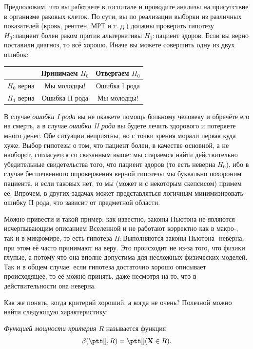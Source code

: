 \begin{example}
Предположим, что вы работаете в госпитале и проводите анализы на присутствие в организме раковых клеток. По сути, вы по реализации выборки из различных показателей (кровь, рентген, МРТ и т. д.) должны проверить гипотезу $H_0\colon\textit{пациент болен раком}$ против альтернативы $H_1\colon\textit{пациент здоров}$. Если вы верно поставили диагноз, то всё хорошо. Иначе вы можете совершить одну из двух ошибок:

\begin{center}
    \begin{tabular}{|c|c|c|}
\hline
 & Принимаем $H_0$ & Отвергаем $H_0$\\
\hline
$H_0$ верна& Мы молодцы! & Ошибка I рода\\
\hline
$H_1$ верна& Ошибка II рода & Мы молодцы!\\
\hline
\end{tabular}
\end{center}

В случае \textit{ошибки I рода} вы не окажете помощь больному человеку и обречёте его на смерть, а в случае \textit{ошибки II рода} вы будете лечить здорового и потеряете много денег. Обе ситуации неприятны, но с точки зрения морали первая куда хуже. Выбор гипотезы о том, что пациент болен, в качестве основной, а не наоборот, согласуется со сказанным выше: мы стараемся найти действительно убедительные свидетельства того, что пациент здоров (то есть неверна $H_0$), ибо в случае беспочвенного опровержения верной гипотезы мы буквально похороним пациента, и если таковых нет, то мы (может и с некоторым скепсисом) примем её. Впрочем, в других задачах может представляться логичным минимизировать ошибку II рода, что зависит от предметной области.

Можно привести и такой пример: как известно, законы Ньютона не являются исчерпывающим описанием Вселенной и не работают корректно как в макро-, так и в микромире, то есть гипотеза $H\colon\textit{Выполняются законы Ньютона }$ неверна, при этом её часто принимают на веру. Это происходит не из-за того, что физики глупые, а потому что она вполне допустима для несложных физических моделей. Так и в общем случае: если гипотеза достаточно хорошо описывает происходящее, то её можно принять, даже несмотря на то, что в действительности она неверна. 
\end{example}

Как же понять, когда критерий хороший, а когда не очень? Полезной можно найти следующую характеристику:
\begin{definition}
\textit{Функцией мощности критерия $R$} называется функция $$\beta(\pth[], R) = \pth[](\mathbf X \in R).$$
\end{definition}

